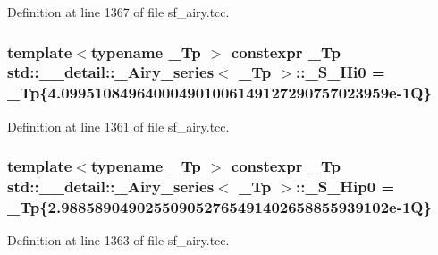 Definition at line 1367 of file sf\+\_\+airy.\+tcc.

\subsubsection[{\texorpdfstring{\+\_\+\+S\+\_\+\+Hi0}{_S_Hi0}}]{\setlength{\rightskip}{0pt plus 5cm}template$<$typename \+\_\+\+Tp $>$ constexpr \+\_\+\+Tp {\bf std\+::\+\_\+\+\_\+detail\+::\+\_\+\+Airy\+\_\+series}$<$ \+\_\+\+Tp $>$\+::\+\_\+\+S\+\_\+\+Hi0 = \+\_\+\+Tp\{4.\+099510849640004901006149127290757023959e-\/1\+Q\}\hspace{0.3cm}{\ttfamily [static]}}\hypertarget{classstd_1_1____detail_1_1__Airy__series_a9968426a52459123041f5fc11d73a854}{}\label{classstd_1_1____detail_1_1__Airy__series_a9968426a52459123041f5fc11d73a854}


Definition at line 1361 of file sf\+\_\+airy.\+tcc.

\subsubsection[{\texorpdfstring{\+\_\+\+S\+\_\+\+Hip0}{_S_Hip0}}]{\setlength{\rightskip}{0pt plus 5cm}template$<$typename \+\_\+\+Tp $>$ constexpr \+\_\+\+Tp {\bf std\+::\+\_\+\+\_\+detail\+::\+\_\+\+Airy\+\_\+series}$<$ \+\_\+\+Tp $>$\+::\+\_\+\+S\+\_\+\+Hip0 = \+\_\+\+Tp\{2.\+988589049025509052765491402658855939102e-\/1\+Q\}\hspace{0.3cm}{\ttfamily [static]}}\hypertarget{classstd_1_1____detail_1_1__Airy__series_a848fb790433db9dc427f9dd37a33da39}{}\label{classstd_1_1____detail_1_1__Airy__series_a848fb790433db9dc427f9dd37a33da39}


Definition at line 1363 of file sf\+\_\+airy.\+tcc.

